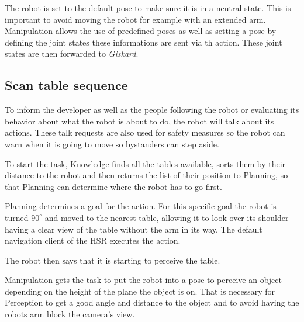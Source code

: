 \documentclass[main.tex]{subfiles}
\begin{document}
	\begin{manipulation}
	The robot is set to the default pose to make sure it is in a neutral state. This is important to avoid moving the robot for example with an extended arm. Manipulation allows the use of predefined poses as well as setting a pose by defining the joint states these informations are sent via th  action. These joint states are then forwarded to \textit{Giskard}.\end{manipulation}
	
	\subsection{Scan table sequence}
	
	\begin{nlp}
	To inform the developer as well as the people following the robot or evaluating its behavior about what the robot is about to do, the robot will talk about its actions. These talk requests are also used for safety measures so the robot can warn when it is going to move so bystanders can step aside. \end{nlp}
	
	\begin{knowledge}
	To start the task, Knowledge finds all the tables available, sorts them by their distance to the robot and then returns the list of their position to Planning, so that Planning can determine where the robot has to go first.\end{knowledge}
	
	\begin{navigation}
	Planning determines a goal for the  action. For this specific goal the robot is turned $90^\circ$ and moved to the nearest table, allowing it to look over its shoulder having a clear view of the table without the arm in its way. The default navigation client of the HSR executes the action. \end{navigation}
	
	\begin{nlp}
	The robot then says that it is starting to perceive the table.\end{nlp}
	
	\begin{manipulation}
	Manipulation gets the task to put the robot into a pose to perceive an object depending on the height of the plane the object is on.
    That is necessary for Perception to get a good angle and distance to the object and to avoid having the robots arm block the camera's view.
    \end{manipulation}
	
\end{document}
